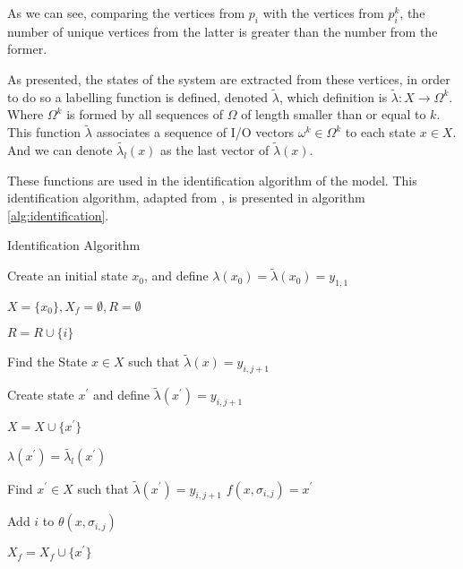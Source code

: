 As we can see, comparing the vertices from $p_i$ with the vertices from $p_i^k$,
the number of unique vertices from the latter is greater than the number from the former.

As presented, the states of the system are extracted from these vertices, in order to
do so a labelling function is defined, denoted $\tilde{\lambda}$, which
definition is $\tilde{\lambda}:X\rightarrow \Omega^k$. Where $\Omega^k$ is
formed by all sequences of $\Omega$ of length smaller than or equal to $k$. This
function $\tilde{\lambda}$ associates a sequence of I\slash O vectors $\omega^k
\in \Omega^k$ to each state $x \in X$. And we can denote $\tilde{\lambda_l}(x)$
as the last vector of $\tilde{\lambda}(x)$.

These functions are used in the
identification algorithm of the \DAOCT{} model. This identification algorithm, adapted from
\cite{moreira2018enhanced}, is presented in algorithm \ref{alg:identification}.


\vspace{1cm}
\begin{algorithm2e}[H]
  \caption{Identification Algorithm}\label{alg:identification}
    \BlankLine Create an initial state $x_0$, and define $\lambda(x_0) =
  \tilde{\lambda}(x_0) = y_{1,1}$

  $X = \{ x_0\}, X_f = \emptyset, R = \emptyset$

   { $R = R \cup \{ i \}$
  
     { Find the State $x \in X $ such that
      $\tilde{\lambda}(x) = y_{i,j+1}$

       { Create
        state $x^\prime$ and define $\tilde{\lambda}(x^\prime) = y_{i,j+1}$

        $X = X \cup \{ x^\prime\}$

        $\lambda(x^\prime) = \tilde{\lambda_l}(x^\prime)$

      } { Find $x^\prime \in X$ such that $\tilde{\lambda}(x^\prime) =
        y_{i,j+1}$ } $f(x,\sigma_{i,j}) = x^\prime$

      Add $i$ to $\theta(x,\sigma_{i,j})$

       { $X_f = X_f \cup \{x^\prime\}$ } } }
\end{algorithm2e}

